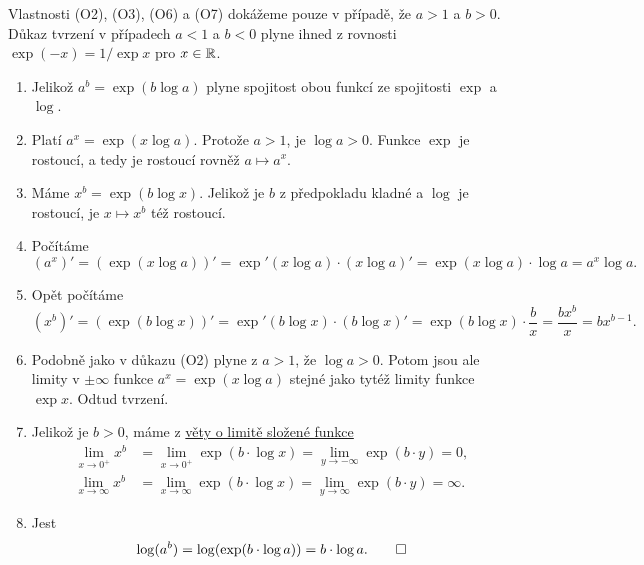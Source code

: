 \begin{propproof}
 Vlastnosti (O2), (O3), (O6) a (O7) dokážeme pouze v případě, že $a > 1$ a $b >
 0$. Důkaz tvrzení v případech $a < 1$ a $b < 0$ plyne ihned z rovnosti
 $\exp(-x) = 1 / \exp x$ pro $x \in \mathbb{R}$.
  
 \begin{enumerate}[label=(O\arabic*)]
  \item Jelikož $a^{b} = \exp(b \log a)$ plyne spojitost obou funkcí ze
   spojitosti $\exp$ a $\log$.
  \item Platí $a^{x} = \exp(x \log a)$. Protože $a > 1$, je $\log a > 0$. Funkce
   $\exp$ je rostoucí, a tedy je rostoucí rovněž $a \mapsto a^{x}$.
  \item Máme $x^{b} = \exp(b \log x)$. Jelikož je $b$ z předpokladu kladné a
   $\log$ je rostoucí, je $x \mapsto x^{b}$ též rostoucí.
  \item Počítáme
   \[
    (a^{x})' = (\exp(x \log a))' = \exp'(x \log a) \cdot (x \log a)' = \exp(x
    \log a) \cdot \log a = a^{x} \log a.
   \]
  \item Opět počítáme
   \[
    (x^{b})' = (\exp(b\log x))' = \exp'(b \log x) \cdot (b\log x)' = \exp(b \log
    x) \cdot \frac{b}{x} = \frac{bx^{b}}{x} = bx^{b-1}.
   \]
  \item Podobně jako v důkazu (O2) plyne z $a > 1$, že $\log a > 0$. Potom jsou
   ale limity v $ \pm \infty$ funkce $a^{x} = \exp(x \log a)$ stejné jako tytéž
   limity funkce $\exp x$. Odtud tvrzení.
  \item Jelikož je $b > 0$, máme z \hyperref[thm:limita-slozene-funkce]{věty o
   limitě složené funkce} 
   \begin{align*}
    \lim_{x \to 0^{+}} x^{b} &= \lim_{x \to 0^{+}} \exp(b \cdot \log x) = \lim_{y
    \to -\infty} \exp(b \cdot y) = 0,\\
     \lim_{x \to \infty} x^{b} &= \lim_{x \to \infty} \exp(b \cdot \log x) =
     \lim_{y \to \infty} \exp(b \cdot y) = \infty.
   \end{align*}
  \item Jest
   \[
    \log(a^{b}) = \log(\exp(b \cdot \log a)) = b \cdot \log a. \qedhere
   \]
 \end{enumerate}
\end{propproof}

